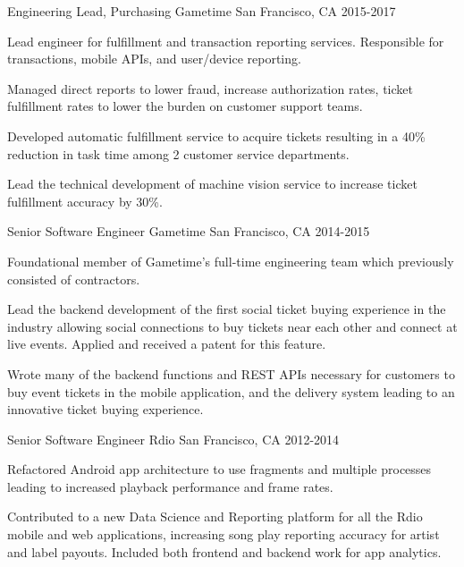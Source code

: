 \begin{cventries}
  \cventry
    {Engineering Lead, Purchasing} %
    {Gametime} %
    {San Francisco, CA} %
    {2015-2017} %
    {
      \begin{cvitems} %
        \item {Lead engineer for fulfillment and transaction reporting services. Responsible for transactions, mobile APIs, and user/device reporting.}
        \item {Managed direct reports to lower fraud, increase authorization rates, ticket fulfillment rates to lower the burden on customer support teams.}
        \item {Developed automatic fulfillment service to acquire tickets resulting in a 40\% reduction in task time among 2 customer service departments.}
        \item {Lead the technical development of machine vision service to increase ticket fulfillment accuracy by 30\%.}
      \end{cvitems}
    }

  \cventry
    {Senior Software Engineer} %
    {Gametime} %
    {San Francisco, CA} %
    {2014-2015} %
    {
      \begin{cvitems} %
        \item {Foundational member of Gametime's full-time engineering team which previously consisted of contractors.}
        \item {Lead the backend development of the first social ticket buying experience in the industry allowing social connections to buy tickets near each other and connect at live events. Applied and received a patent for this feature.}
        \item {Wrote many of the backend functions and REST APIs necessary for customers to buy event tickets in the mobile application, and the delivery system leading to an innovative ticket buying experience.}
      \end{cvitems}
    }

  \cventry
    {Senior Software Engineer} %
    {Rdio} %
    {San Francisco, CA} %
    {2012-2014} %
    {
      \begin{cvitems} %
        \item {Refactored Android app architecture to use fragments and multiple processes leading to increased playback performance and frame rates.}
        \item {Contributed to a new Data Science and Reporting platform for all the Rdio mobile and web applications, increasing song play reporting accuracy for artist and label payouts. Included both frontend and backend work for app analytics.}
      \end{cvitems}
    }

\end{cventries}
